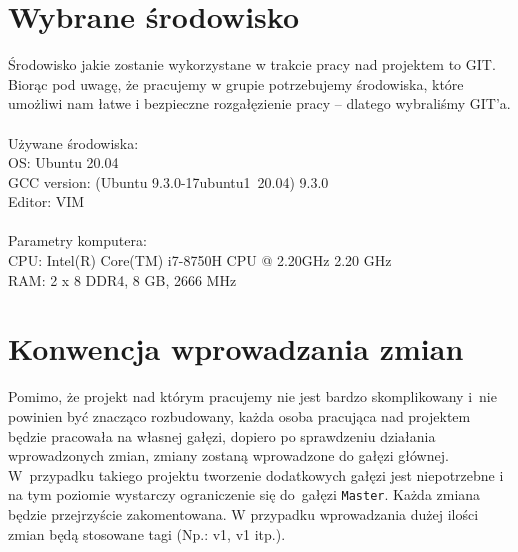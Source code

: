 \documentclass[12pt, a4paper]{article}
\begin{document}
\section{Wybrane środowisko}
Środowisko jakie zostanie wykorzystane w trakcie pracy nad projektem to GIT. Biorąc pod uwagę, że pracujemy w grupie potrzebujemy środowiska, które umożliwi nam łatwe i bezpieczne rozgałęzienie pracy -- dlatego wybraliśmy GIT'a.\\\\

Używane środowiska:\\
OS: Ubuntu 20.04\\
GCC version: (Ubuntu 9.3.0-17ubuntu1~20.04) 9.3.0\\
Editor: VIM\\\\
Parametry komputera:\\
CPU: Intel(R) Core(TM) i7-8750H CPU @ 2.20GHz   2.20 GHz\\
RAM: 2 x 8 DDR4, 8 GB, 2666 MHz

\section{Konwencja wprowadzania zmian}
Pomimo, że projekt nad którym pracujemy nie jest bardzo skomplikowany i~nie powinien być znacząco rozbudowany, każda osoba pracująca nad projektem będzie pracowała na własnej gałęzi, dopiero po sprawdzeniu działania wprowadzonych zmian, zmiany zostaną wprowadzone do gałęzi głównej. W~przypadku takiego projektu tworzenie dodatkowych gałęzi jest niepotrzebne i na tym poziomie wystarczy ograniczenie się do~gałęzi \texttt{Master}. Każda zmiana będzie przejrzyście zakomentowana. W przypadku wprowadzania dużej ilości zmian będą stosowane tagi (Np.: v1, v1 itp.).
 
\end{document}
